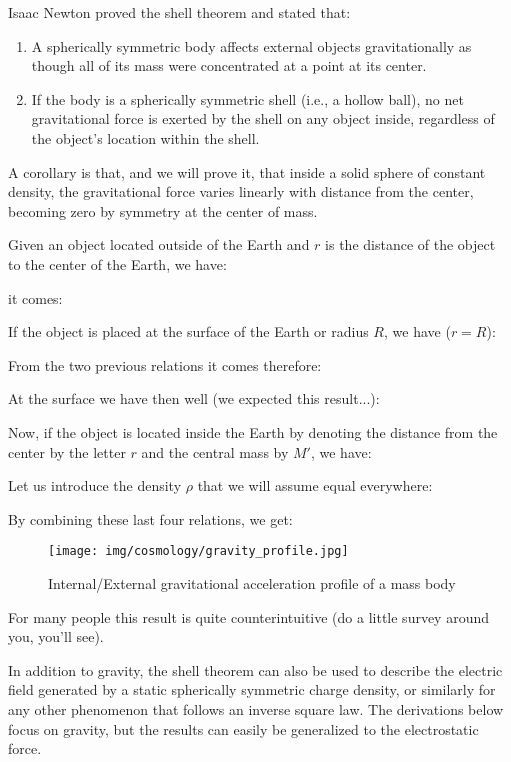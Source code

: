 	Isaac Newton proved the shell theorem and stated that:
	\begin{enumerate}
		\item A spherically symmetric body affects external objects gravitationally as though all of its mass were concentrated at a point at its center.
		\item If the body is a spherically symmetric shell (i.e., a hollow ball), no net gravitational force is exerted by the shell on any object inside, regardless of the object's location within the shell.
	\end{enumerate}
	A corollary is that, and we will prove it, that inside a solid sphere of constant density, the gravitational force varies linearly with distance from the center, becoming zero by symmetry at the center of mass.
	
	Given an object located outside of the Earth and $r$ is the distance of the object to the center of the Earth, we have:
	
	it comes:
	
	If the object is placed at the surface of the Earth or radius $R$, we have ($r=R$):
	
	From the two previous relations it comes therefore:
	
	At the surface we have then well (we expected this result...):
	
	Now, if the object is located inside the Earth by denoting the distance from the center by the letter $r$ and the central mass by $M'$, we have:
	
	Let us introduce the density $\rho$ that we will assume equal everywhere:
	
	By combining these last four relations, we get:
	
	\begin{figure}[H]
		\begin{center}
		\texttt{[image: img/cosmology/gravity\_profile.jpg]}
		\end{center}	
		\caption{Internal/External gravitational acceleration profile of a mass body}
	\end{figure}

	For many people this result is quite counterintuitive (do a little survey around you, you'll see).
	
	\begin{tcolorbox}[title=Remark,colframe=black,arc=10pt]
	In addition to gravity, the shell theorem can also be used to describe the electric field generated by a static spherically symmetric charge density, or similarly for any other phenomenon that follows an inverse square law. The derivations below focus on gravity, but the results can easily be generalized to the electrostatic force. 
	\end{tcolorbox}
	
